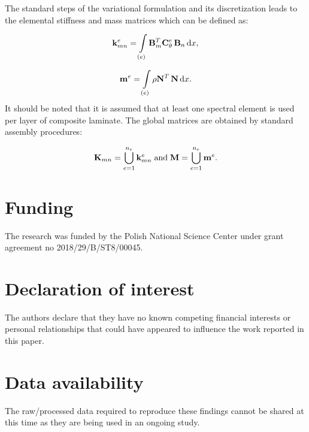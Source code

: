 	 The standard steps of the variational formulation and its discretization leads to the elemental stiffness and mass matrices which can be defined as:
	 
\begin{equation}
	 \mathbf{k}_{mn}^e= \int \limits_{(e)} \mathbf{B}_m^{T} \mathbf{C}_{\theta}^e \, \mathbf{B}_n\, \mathrm{d} x ,
	\label{eq:stiffness_matrix}\end{equation}
	 
\begin{equation}
	 \mathbf{m}^e= \int \limits_{(e)}\rho \mathbf{N}^{T} \, \mathbf{N}\, \mathrm{d} x .
 	\end{equation}
 	It should be noted that it is assumed that at least one spectral element is used per layer of composite laminate.
 	The global matrices are obtained by standard assembly procedures:
 	
\begin{equation}
 	\mathbf{K}_{mn}= \bigcup_{e=1}^{n_e} \mathbf{k}_{mn}^{e} \; \textrm{and} \; \mathbf{M}= \bigcup_{e=1}^{n_e} \mathbf{m}^{e}. 
 	\end{equation}
		
\section*{Funding}
   The research was funded by the Polish National Science Center under grant agreement no 2018/29/B/ST8/00045. 
	
	
\section*{Declaration of interest}
	The authors declare that they have no known competing financial interests or personal relationships that could have appeared to influence the work reported in this paper.
	
	
\section*{Data availability}
	The raw/processed data required to reproduce these findings cannot be shared at this time as they are being used in an ongoing study.
						
			    
	



